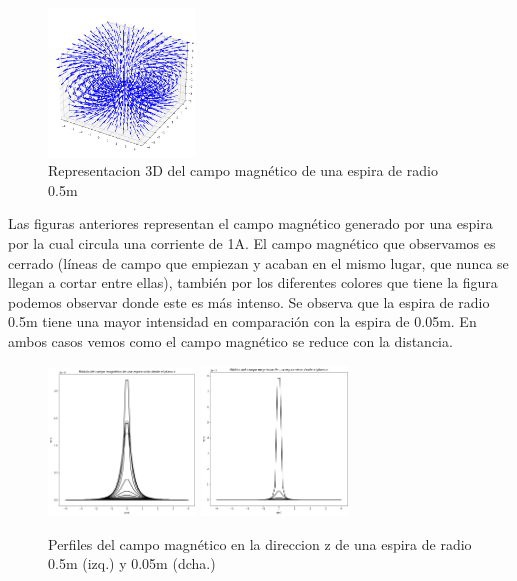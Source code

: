 \documentclass[11pt]{article}
\begin{document}
        \begin{figure}[h]
            \centering
            \includegraphics[width=0.35\textwidth]{Mag 3d.png}
            \caption{Representacion 3D del campo magnético de una espira de radio 0.5m}
            \label{fig:my_label}
        \end{figure}

\vspace{5mm} Las figuras anteriores representan el campo magnético generado por una espira por la cual circula una corriente de 1A. El campo magnético que observamos es cerrado (líneas de campo que empiezan y acaban en el mismo lugar, que nunca se llegan a cortar entre ellas), también por los diferentes colores que tiene la figura podemos observar donde este es más intenso. Se observa que la espira de radio 0.5m tiene una mayor intensidad en comparación con la espira de 0.05m. En ambos casos vemos como el campo magnético se reduce con la distancia.
\clearpage
        \begin{figure}[h]
            \centering
            \includegraphics[width=0.35\textwidth]{Mag z.png}
            \hspace{1cm}
            \includegraphics[width=0.35\textwidth]{Mag 0.05 z.png}
            \caption{Perfiles del campo magnético en la direccion z de una espira de radio 0.5m (izq.) y 0.05m (dcha.)}
        \end{figure}
\end{document}
